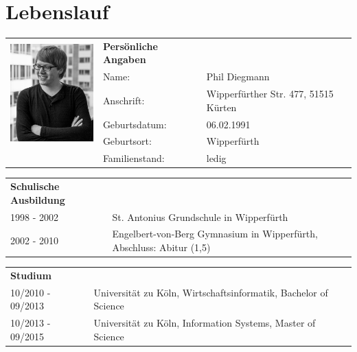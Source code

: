 \section*{\hspace{0.2cm}Lebenslauf} 

\begin{flushleft}

\begin{tabular}{p{11em} p{10em} p{10em}}
    \multirow{5}{*}{\includegraphics[width=40mm]{figures/passfoto.jpg}} & \textbf{Persönliche Angaben} & \addspace \\
    & Name: & Phil Diegmann \\
    & Anschrift: & Wipperfürther Str. 477, 51515 Kürten \\
    & Geburtsdatum: & 06.02.1991 \\
    & Geburtsort: & Wipperfürth \\
    & Familienstand: & ledig \\
\end{tabular}

\vspace{1.5em}

\begin{tabular}{p{11em} p{22.5em}}
    \textbf{Schulische Ausbildung} & \addspace \\
    1998 - 2002 & St. Antonius Grundschule in Wipperfürth \\
    2002 - 2010 & Engelbert-von-Berg Gymnasium in Wipperfürth, Abschluss: Abitur (1,5) \\
\end{tabular}

\vspace{0.5em}

\begin{tabular}{p{11em} p{22.5em}}
    \textbf{Studium} & \addspace \\
    10/2010 - 09/2013 & Universität zu Köln, Wirtschaftsinformatik, Bachelor of Science \\
    10/2013 - 09/2015 & Universität zu Köln, Information Systems, Master of Science
\end{tabular}


\vspace{-1em}



\end{flushleft}